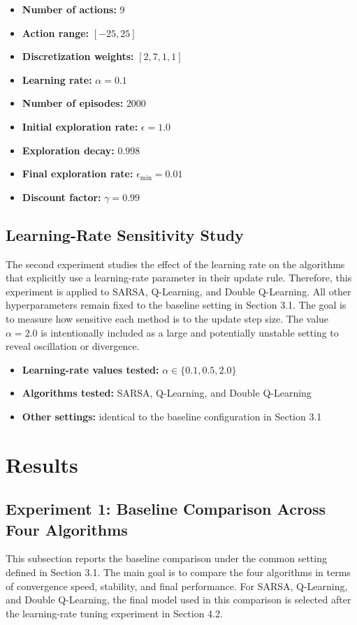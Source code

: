 \documentclass[11pt]{article} %
\begin{document}
\begin{itemize}
    \item \textbf{Number of actions:} $9$
    \item \textbf{Action range:} $[-25,25]$
    \item \textbf{Discretization weights:} $[2,7,1,1]$
    \item \textbf{Learning rate:} $\alpha = 0.1$
    \item \textbf{Number of episodes:} $2000$
    \item \textbf{Initial exploration rate:} $\epsilon = 1.0$
    \item \textbf{Exploration decay:} $0.998$
    \item \textbf{Final exploration rate:} $\epsilon_{\min} = 0.01$
    \item \textbf{Discount factor:} $\gamma = 0.99$
\end{itemize}

\subsection{Learning-Rate Sensitivity Study}
The second experiment studies the effect of the learning rate on the algorithms that explicitly use a learning-rate parameter in their update rule. Therefore, this experiment is applied to SARSA, Q-Learning, and Double Q-Learning. All other hyperparameters remain fixed to the baseline setting in Section 3.1. The goal is to measure how sensitive each method is to the update step size. The value $\alpha = 2.0$ is intentionally included as a large and potentially unstable setting to reveal oscillation or divergence.

\begin{itemize}
    \item \textbf{Learning-rate values tested:} $\alpha \in \{0.1, 0.5, 2.0\}$
    \item \textbf{Algorithms tested:} SARSA, Q-Learning, and Double Q-Learning
    \item \textbf{Other settings:} identical to the baseline configuration in Section 3.1
\end{itemize}

\section{Results}

\subsection{Experiment 1: Baseline Comparison Across Four Algorithms}
This subsection reports the baseline comparison under the common setting defined in Section 3.1. The main goal is to compare the four algorithms in terms of convergence speed, stability, and final performance. For SARSA, Q-Learning, and Double Q-Learning, the final model used in this comparison is selected after the learning-rate tuning experiment in Section 4.2.
\end{document}

